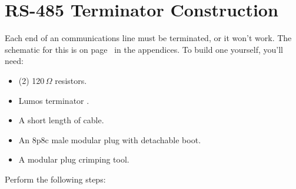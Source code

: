 \documentclass[letterpaper,twoside,onecolumn,openright,final]{memoir}
\begin{document}
\section{RS-485 Terminator Construction}\label{sec:terminator}
Each end of an  communications line must be terminated, or it won't work.
The schematic for this is on page~\pageref{sch:terminator} in the 
appendices.  To build one yourself, you'll need:
\begin{itemize}
\item	(2) 120\,$\Omega$ resistors.
\item	Lumos  terminator .
\item	A short length of  cable.
\item	An 8p8c male modular plug with detachable boot.
\item	A modular plug crimping tool.
\end{itemize}
Perform the following steps:
\end{document}
